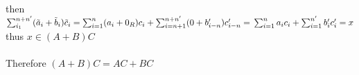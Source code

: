 \documentclass[12pt]{extarticle}
\begin{document}
\begin{enumerate}
\begin{enumerate}
then  $\sum_{i_1}^{n+n'} (\tilde{a}_i  + \tilde{b}_i) \tilde{c}_i = \sum_{i = 1}^{n} (a_i + 0_R) c_i + \sum_{i = n + 1}^{n+n'} (0 + b_{i-n}') c_{i-n}' = \\ \sum_{i = 1}^{n} a_i c_i + \sum_{i = 1}^{n'} b_i' c_i' = x$ thus $x \in (A+B)C$\\ \\ Therefore $(A+B)C = AC + BC$
\end{enumerate}

\end{enumerate}
\end{document}
